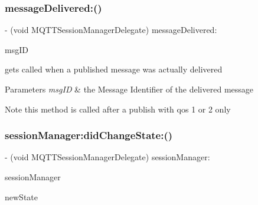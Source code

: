 \subsubsection{\texorpdfstring{message\+Delivered\+:()}{messageDelivered:()}}
{\footnotesize\ttfamily -\/ (void M\+Q\+T\+T\+Session\+Manager\+Delegate) message\+Delivered\+: \begin{DoxyParamCaption}\item[{(U\+Int16)}]{msg\+ID }\end{DoxyParamCaption}\hspace{0.3cm}{\ttfamily [optional]}}

gets called when a published message was actually delivered 
\begin{DoxyParams}{Parameters}
{\em msg\+ID} & the Message Identifier of the delivered message \\
\hline
\end{DoxyParams}
\begin{DoxyNote}{Note}
this method is called after a publish with qos 1 or 2 only 
\end{DoxyNote}
\mbox{\label{protocol_m_q_t_t_session_manager_delegate_01-p_a6569e1ca87d4e098645e715ac69dcc53}} 
\subsubsection{\texorpdfstring{session\+Manager\+:did\+Change\+State\+:()}{sessionManager:didChangeState:()}}
{\footnotesize\ttfamily -\/ (void M\+Q\+T\+T\+Session\+Manager\+Delegate) session\+Manager\+: \begin{DoxyParamCaption}\item[{(\hyperlink{interface_m_q_t_t_session_manager}{M\+Q\+T\+T\+Session\+Manager} $\ast$)}]{session\+Manager }\item[{didChangeState:(M\+Q\+T\+T\+Session\+Manager\+State)}]{new\+State }\end{DoxyParamCaption}\hspace{0.3cm}{\ttfamily [optional]}}

